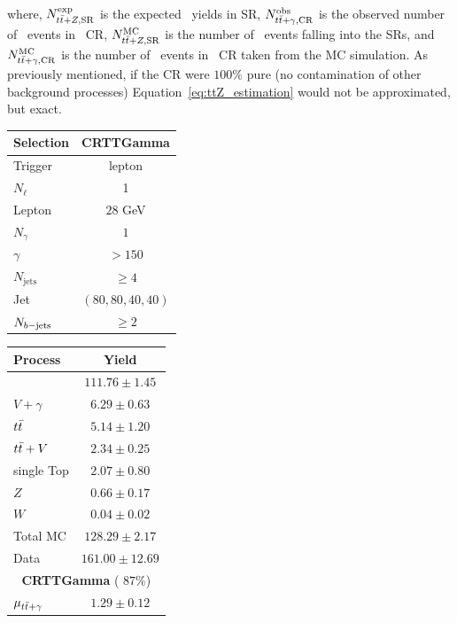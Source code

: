 		\noindent where, $N_{t\bar{t}+Z,\mathrm{SR}}^{\mathrm{exp}}$ is the expected \ttZ\ yields in \ac{SR}, $N_{t\bar{t}+\gamma,\mathrm{CR}}^{\mathrm{obs}}$ is the observed number of \ttgamma\ events in \ttgamma\ \ac{CR}, $N_{t\bar{t}+Z,\mathrm{SR}}^{\mathrm{MC}}$ is the number of \ttZ\ events falling into the \acp{SR}, and $N_{t\bar{t}+\gamma,\mathrm{CR}}^{\mathrm{MC}}$ is the number of \ttgamma\ events in \ttgamma\ \ac{CR} taken from the \ac{MC} simulation. As previously mentioned, if the \ac{CR} were $100\%$ pure (no contamination of other background processes) Equation~\ref{eq:ttZ_estimation} would not be approximated, but exact.

		\begin{table}
			\parbox{.45\linewidth}{
			\centering
			\label{tab:CRTTGamma}
		   	\begin{tabular}{lc}
			      \toprule
			      \textbf{Selection}  & \textbf{CRTTGamma} \\
			      \toprule
			      Trigger & lepton \\ 
			      $N_{\ell}$ & 1 \\
			      Lepton \pt & $28$ GeV \\
			      \midrule
			      $N_{\gamma}$ & $1$\\
			      $\gamma$ \pT\ & $> 150$ \GeV \\
			      \midrule
			      $N_{\mathrm{jets}}$ & $ \geq 4 $ \\
			      Jet \pT\ & $(80,80,40,40)$ \GeV \\
			      $N_{b\mathrm{-jets}}$ & $\ge 2$ \\
			      \bottomrule
			   \end{tabular}
			}
			\hfill
			\parbox{.45\linewidth}{
			\centering
			\label{tab:CRTTGamma_yields}
				\begin{tabular}{lc}
					\toprule
					\textbf{Process} & \textbf{Yield} \\
					\toprule
					\ttgamma & $111.76 \pm 1.45$ \\
					$V+\gamma$ & $6.29 \pm 0.63$ \\
					$t\bar{t}$ & $5.14 \pm 1.20$ \\
					$t\bar{t}+V$ & $2.34 \pm 0.25$ \\
					single Top & $2.07 \pm 0.80$ \\
					$Z$ & $0.66 \pm 0.17$ \\
					$W$ & $0.04 \pm 0.02$ \\
					\midrule
					Total MC & $128.29 \pm 2.17$ \\
					Data & $161.00 \pm 12.69$ \\
					\midrule
					\multicolumn{2}{c}{\textbf{CRTTGamma} ( $87\%$)} \\ 
					\midrule
					$\mu_{t\bar{t}+\gamma}$ & $1.29 \pm 0.12$ \\
					\bottomrule
				\end{tabular}
			}
		\end{table}

